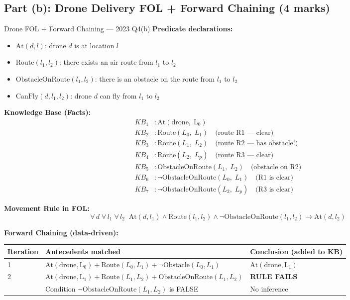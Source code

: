 \documentclass[12pt,a4paper]{article}
\newcommand{\ALL}[1]{\forall\,#1\;}
\newcommand{\ra}{\rightarrow}
\begin{document}
\subsection{Part (b): Drone Delivery FOL + Forward Chaining (4 marks)}

\begin{solbox}{Drone FOL + Forward Chaining --- 2023 Q4(b)}
\textbf{Predicate declarations:}
\begin{itemize}[noitemsep]
  \item $\mathrm{At}(d,l)$: drone $d$ is at location $l$
  \item $\mathrm{Route}(l_1,l_2)$: there exists an air route from $l_1$ to $l_2$
  \item $\mathrm{ObstacleOnRoute}(l_1,l_2)$: there is an obstacle on the route from $l_1$ to $l_2$
  \item $\mathrm{CanFly}(d,l_1,l_2)$: drone $d$ can fly from $l_1$ to $l_2$
\end{itemize}

\textbf{Knowledge Base (Facts):}
\begin{align*}
  KB_1&: \mathrm{At(drone,\;L_0)} \\
  KB_2&: \mathrm{Route}(L_0,\;L_1) \quad\text{(route R1 --- clear)}\\
  KB_3&: \mathrm{Route}(L_1,\;L_2) \quad\text{(route R2 --- has obstacle!)}\\
  KB_4&: \mathrm{Route}(L_2,\;L_p) \quad\text{(route R3 --- clear)}\\
  KB_5&: \mathrm{ObstacleOnRoute}(L_1,\;L_2)\quad\text{(obstacle on R2)}\\
  KB_6&: \neg\mathrm{ObstacleOnRoute}(L_0,\;L_1)\quad\text{(R1 is clear)}\\
  KB_7&: \neg\mathrm{ObstacleOnRoute}(L_2,\;L_p)\quad\text{(R3 is clear)}
\end{align*}

\textbf{Movement Rule in FOL:}
\[\ALL{d}\ALL{l_1}\ALL{l_2}\;\mathrm{At}(d,l_1) \land \mathrm{Route}(l_1,l_2) \land \neg\mathrm{ObstacleOnRoute}(l_1,l_2) \ra \mathrm{At}(d,l_2)\]

\textbf{Forward Chaining (data-driven):}
\begin{center}
\begin{tabular}{@{}l@{\quad}l@{\quad}l@{}}
  \toprule
  \textbf{Iteration} & \textbf{Antecedents matched} & \textbf{Conclusion (added to KB)} \\
  \midrule
  1 & $\mathrm{At(drone,L_0)} + \mathrm{Route}(L_0,L_1) + \neg\mathrm{Obstacle}(L_0,L_1)$ & $\mathrm{At(drone,L_1)}$ \\[3pt]
  2 & $\mathrm{At(drone,L_1)} + \mathrm{Route}(L_1,L_2) + \mathrm{ObstacleOnRoute}(L_1,L_2)$ & \textbf{RULE FAILS} \\
    & Condition $\neg\mathrm{ObstacleOnRoute}(L_1,L_2)$ is FALSE & No inference \\
  \bottomrule
\end{tabular}
\end{center}


\end{solbox}
\end{document}
